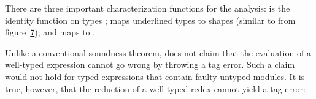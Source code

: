 \documentclass[screen=true, natbib=false, 10pt, sigplan]{acmart}
\newcommand{\FigureRef}[2]{#1}
\begin{document}

There are three important characterization functions \relax{$\stypemap$} for the analysis:
 \relax{$\stypemapone$} is the identity function on types \relax{$\stype$};
 \relax{$\stypemapshape$} maps underlined types \relax{$\tfloor{\stype}$}
 to shapes \relax{$\sshape$} (similar to \relax{$\sshapecheck$} from figure~\hyperref[t:x28counter_x28x22figurex22_x22figx3amodelx3ashallowx2dtypex22x29x29]{\FigureRef{7}{t:x28counter_x28x22figurex22_x22figx3amodelx3ashallowx2dtypex22x29x29}});
 and \relax{$\stypemapzero$} maps \relax{$\tdyn$} to \relax{$\tdyn$}.


Unlike a conventional soundness theorem,
 does not claim that the evaluation of a well{-}typed
expression cannot go wrong by throwing a tag error.
Such a claim would not hold for typed expressions that contain
faulty untyped modules.
It is true, however, that the reduction of a well{-}typed redex cannot yield
a tag error:
\end{document}
